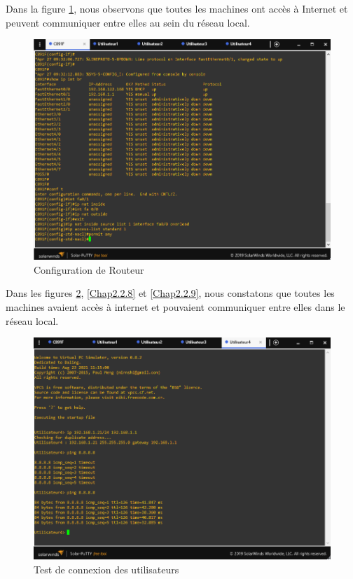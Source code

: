 \smallskip


Dans la figure \ref{Chap2.2.6}, nous observons que toutes les machines ont accès à Internet et peuvent communiquer entre elles au sein du réseau local.



\smallskip

\begin{figure}[H]
 \centering
    \includegraphics[width=16cm]{Images/BRades-Topologie6.png}
    \caption{Configuration de Routeur}
    \label{Chap2.2.6}
\end{figure}

\smallskip



Dans les figures \ref{Chap2.2.7}, \ref{Chap2.2.8} et \ref{Chap2.2.9}, nous constatons que toutes les machines avaient accès à internet et pouvaient communiquer entre elles dans le réseau local. \\

\smallskip

\begin{figure}[H]
 \centering
    \includegraphics[width=16cm]{Images/BRades-Topologie7.png}
    \caption{Test de connexion des utilisateurs}
    \label{Chap2.2.7}
\end{figure}

